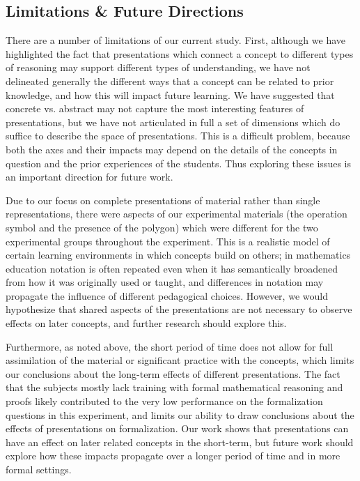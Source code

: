 \documentclass[man,10pt]{apa6}
\begin{document}
\subsection{Limitations \& Future Directions}
There are a number of limitations of our current study. First, although we have highlighted the fact that presentations which connect a concept to different types of reasoning may support different types of understanding, we have not delineated generally the different ways that a concept can be related to prior knowledge, and how this will impact future learning. We have suggested that concrete vs. abstract may not capture the most interesting features of presentations, but we have not articulated in full a set of dimensions which do suffice to describe the space of presentations. This is a difficult problem, because both the axes and their impacts may depend on the details of the concepts in question and the prior experiences of the students. Thus exploring these issues is an important direction for future work. \par 
Due to our focus on complete presentations of material rather than single representations, there were aspects of our experimental materials (the operation symbol and the presence of the polygon) which were different for the two experimental groups throughout the experiment. This is a realistic model of certain learning environments in which concepts build on others; in mathematics education notation is often repeated even when it has semantically broadened from how it was originally used or taught, and differences in notation may propagate the influence of different pedagogical choices. However, we would hypothesize that shared aspects of the presentations are not necessary to observe effects on later concepts, and further research should explore this. \par
Furthermore, as noted above, the short period of time does not allow for full assimilation of the material or significant practice with the concepts, which limits our conclusions about the long-term effects of different presentations. The fact that the subjects mostly lack training with formal mathematical reasoning and proofs likely contributed to the very low performance on the formalization questions in this experiment, and limits our ability to draw conclusions about the effects of presentations on formalization. Our work shows that presentations can have an effect on later related concepts in the short-term, but future work should explore how these impacts propagate over a longer period of time and in more formal settings. \par
\end{document}
